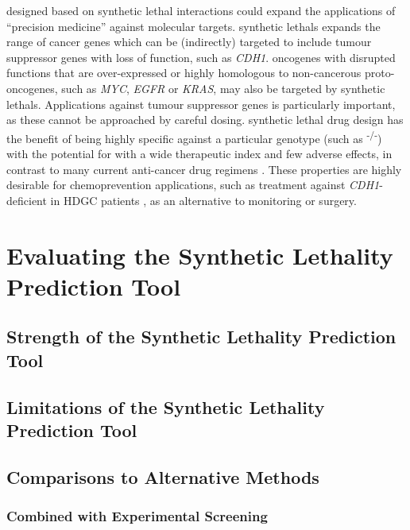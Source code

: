  designed based on \gls{synthetic lethal} interactions could expand the applications of ``precision medicine'' against molecular targets. %
\Glspl{synthetic lethal} expands the range of cancer genes which can be (indirectly) targeted to include \gls{tumour suppressor} genes with loss of function, such as \textit{CDH1}. \Glspl{oncogene} with disrupted functions that are over-expressed or highly homologous to non-cancerous proto-oncogenes, such as \textit{MYC}, \textit{EGFR} or \textit{KRAS}, may also be targeted by \glspl{synthetic lethal}. Applications against \gls{tumour suppressor} genes is particularly important, as these cannot be approached by careful dosing. \Gls{synthetic lethal} drug design has the benefit of being highly specific against a particular genotype (such as \textsuperscript{-/-}) with the potential for  with a wide therapeutic index and few adverse effects, in contrast to many current anti-cancer drug regimens \citep{Hopkins2008, Kaelin2009}. These properties are highly desirable for \gls{chemoprevention} applications, such as treatment against \textit{CDH1}-deficient in \gls{HDGC} patients \citep{Guilford2010}, as an alternative to monitoring or surgery.

\iffalse
\section{Evaluating the Synthetic Lethality Prediction Tool}
\label{chapt6:slipt}


\subsection{Strength of the Synthetic Lethality Prediction Tool}
\label{chapt6:slipt_strengths}

\subsection{Limitations of the Synthetic Lethality Prediction Tool}
\label{chapt6:slipt_limitations}

\subsection{Comparisons to Alternative Methods}
\label{chapt6:slipt_compare}

\subsubsection{Combined with Experimental Screening}
\label{chapt6:slipt_compare_experimental}

